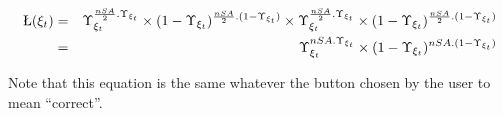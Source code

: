 \begin{eqnarray}
\L(\xi_t) &=& \Upsilon_{\xi_t}^{\frac{nSA}{2}.\Upsilon_{\xi_t}} \times (1-\Upsilon_{\xi_t})^{\frac{nSA}{2}.(1-\Upsilon_{\xi_t})} \times \Upsilon_{\xi_t}^{\frac{nSA}{2}.\Upsilon_{\xi_t}} \times (1-\Upsilon_{\xi_t})^{\frac{nSA}{2}.(1-\Upsilon_{\xi_t})} \nonumber \\
&=& \Upsilon_{\xi_t}^{nSA.\Upsilon_{\xi_t}} \times (1-\Upsilon_{\xi_t})^{nSA.(1-\Upsilon_{\xi_t})} \nonumber
\end{eqnarray}

Note that this equation is the same whatever the button chosen by the user to mean ``correct''.








